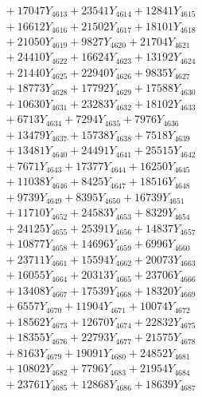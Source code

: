 \documentclass[a4paper,10pt]{article}
\begin{document}
{\begin{align}
&\;  + 17047 Y_{4613} + 23541 Y_{4614} + 12841 Y_{4615} \\[0.3ex]
&\;  + 16612 Y_{4616} + 21502 Y_{4617} + 18101 Y_{4618} \\[0.5ex]\allowbreak
&\;  + 21050 Y_{4619} + 9827 Y_{4620} + 21704 Y_{4621} \\[0.3ex]
&\;  + 24410 Y_{4622} + 16624 Y_{4623} + 13192 Y_{4624} \\[0.3ex]
&\;  + 21440 Y_{4625} + 22940 Y_{4626} + 9835 Y_{4627} \\[0.3ex]
&\;  + 18773 Y_{4628} + 17792 Y_{4629} + 17588 Y_{4630} \\[0.3ex]
&\;  + 10630 Y_{4631} + 23283 Y_{4632} + 18102 Y_{4633} \\[0.3ex]
&\;  + 6713 Y_{4634} + 7294 Y_{4635} + 7976 Y_{4636} \\[0.3ex]
&\;  + 13479 Y_{4637} + 15738 Y_{4638} + 7518 Y_{4639} \\[0.3ex]
&\;  + 13481 Y_{4640} + 24491 Y_{4641} + 25515 Y_{4642} \\[0.3ex]
&\;  + 7671 Y_{4643} + 17377 Y_{4644} + 16250 Y_{4645} \\[0.3ex]
&\;  + 11038 Y_{4646} + 8425 Y_{4647} + 18516 Y_{4648} \\[0.5ex]\allowbreak
&\;  + 9739 Y_{4649} + 8395 Y_{4650} + 16739 Y_{4651} \\[0.3ex]
&\;  + 11710 Y_{4652} + 24583 Y_{4653} + 8329 Y_{4654} \\[0.3ex]
&\;  + 24125 Y_{4655} + 25391 Y_{4656} + 14837 Y_{4657} \\[0.3ex]
&\;  + 10877 Y_{4658} + 14696 Y_{4659} + 6996 Y_{4660} \\[0.3ex]
&\;  + 23711 Y_{4661} + 15594 Y_{4662} + 20073 Y_{4663} \\[0.3ex]
&\;  + 16055 Y_{4664} + 20313 Y_{4665} + 23706 Y_{4666} \\[0.3ex]
&\;  + 13408 Y_{4667} + 17539 Y_{4668} + 18320 Y_{4669} \\[0.3ex]
&\;  + 6557 Y_{4670} + 11904 Y_{4671} + 10074 Y_{4672} \\[0.3ex]
&\;  + 18562 Y_{4673} + 12670 Y_{4674} + 22832 Y_{4675} \\[0.3ex]
&\;  + 18355 Y_{4676} + 22793 Y_{4677} + 21575 Y_{4678} \\[0.5ex]\allowbreak
&\;  + 8163 Y_{4679} + 19091 Y_{4680} + 24852 Y_{4681} \\[0.3ex]
&\;  + 10802 Y_{4682} + 7796 Y_{4683} + 21954 Y_{4684} \\[0.3ex]
&\;  + 23761 Y_{4685} + 12868 Y_{4686} + 18639 Y_{4687} \\[0.3ex]

\end{align}}
\end{document}
